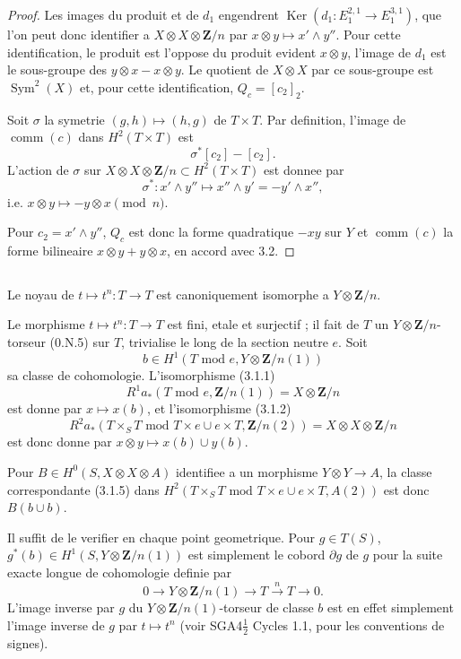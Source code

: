 \documentclass[11pt,a4paper]{article}
\theoremstyle{plain}
\theoremstyle{definition}
\DeclareMathOperator{\Sym}{Sym}
\DeclareMathOperator{\Ker}{Ker}
\DeclareMathOperator{\comm}{comm}
\begin{document}
\begin{proof}
Les images du produit et de $d_1$ engendrent $\Ker(d_1 : E_1^{2,1} \to E_1^{3,1})$, que l'on peut donc identifier a $X \otimes X \otimes \mathbf{Z}/n$ par $x \otimes y \mapsto x' \wedge y''$. Pour cette identification, le produit est l'oppose du produit evident $x \otimes y$, l'image de $d_1$ est le sous-groupe des $y \otimes x - x \otimes y$. Le quotient de $X \otimes X$ par ce sous-groupe est $\Sym^2(X)$ et, pour cette identification, $Q_c = [c_2]_2$.

Soit $\sigma$ la symetrie $(g, h) \mapsto (h, g)$ de $T \times T$. Par definition, l'image de $\comm(c)$ dans $H^2(T \times T)$ est
\[
\sigma^*[c_2] - [c_2].
\]
L'action de $\sigma$ sur $X \otimes X \otimes \mathbf{Z}/n \subset H^2(T \times T)$ est donnee par
\[
\sigma^* : x' \wedge y'' \mapsto x'' \wedge y' = -y' \wedge x'',
\]
i.e. $x \otimes y \mapsto -y \otimes x \pmod{n}$.

Pour $c_2 = x' \wedge y''$, $Q_c$ est donc la forme quadratique $-xy$ sur $Y$ et $\comm(c)$ la forme bilineaire $x \otimes y + y \otimes x$, en accord avec 3.2.
\end{proof}

\subsection{}\label{3.3}

Le noyau de $t \mapsto t^n : T \to T$ est canoniquement isomorphe a $Y \otimes \mathbf{Z}/n$.

Le morphisme $t \mapsto t^n : T \to T$ est fini, etale et surjectif ; il fait de $T$ un $Y \otimes \mathbf{Z}/n$-torseur (0.N.5) sur $T$, trivialise le long de la section neutre $e$. Soit
\[
b \in H^1(T \text{ mod } e, Y \otimes \mathbf{Z}/n(1))
\]
sa classe de cohomologie. L'isomorphisme (3.1.1)
\[
R^1 a_*(T \text{ mod } e, \mathbf{Z}/n(1)) = X \otimes \mathbf{Z}/n
\]
est donne par $x \mapsto x(b)$, et l'isomorphisme (3.1.2)
\[
R^2 a_*(T \times_S T \text{ mod } T \times e \cup e \times T, \mathbf{Z}/n(2)) = X \otimes X \otimes \mathbf{Z}/n
\]
est donc donne par $x \otimes y \mapsto x(b) \cup y(b)$.

Pour $B \in H^0(S, X \otimes X \otimes A)$ identifiee a un morphisme $Y \otimes Y \to A$, la classe correspondante (3.1.5) dans $H^2(T \times_S T \text{ mod } T \times e \cup e \times T, A(2))$ est donc $B(b \cup b)$.

Il suffit de le verifier en chaque point geometrique. Pour $g \in T(S)$, $g^*(b) \in H^1(S, Y \otimes \mathbf{Z}/n(1))$ est simplement le cobord $\partial g$ de $g$ pour la suite exacte longue de cohomologie definie par
\begin{equation}\label{3.3.1}
0 \to Y \otimes \mathbf{Z}/n(1) \to T \xrightarrow{\,n\,} T \to 0.
\end{equation}
L'image inverse par $g$ du $Y \otimes \mathbf{Z}/n(1)$-torseur de classe $b$ est en effet simplement l'image inverse de $g$ par $t \mapsto t^n$ (voir SGA4$\frac{1}{2}$ Cycles 1.1, pour les conventions de signes).
\end{document}
